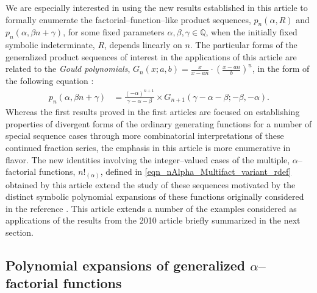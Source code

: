 \documentclass[12pt,reqno]{article}
\numberwithin{sfootnote}{section}
\numberwithin{equation}{section}
\theoremstyle{DefaultTheoremStyle}
\theoremstyle{definition}
\newcommand{\FFactII}[2]{\ensuremath{#1^{\underline{#2}}}}
\newcommand{\MultiFactorial}[2]{\ensuremath{#1!_{\left(#2\right)}}}
\newcommand{\pn}[3]{\ensuremath{p_{#1}\left(#2, #3\right)}}
\begin{document}
We are especially interested in using the new results established in this 
article to formally enumerate the 
factorial--function--like product sequences, 
$\pn{n}{\alpha}{R}$ and $\pn{n}{\alpha}{\beta n + \gamma}$, for some fixed 
parameters $\alpha, \beta, \gamma \in \mathbb{Q}$, when the 
initially fixed symbolic indeterminate, $R$, depends linearly on $n$. 
The particular forms of the 
generalized product sequences of interest in the 
applications of this article are related to the \emph{Gould polynomials}, 
$G_n(x; a, b) = \frac{x}{x-an} \cdot \FFactII{\left(\frac{x-an}{b}\right)}{n}$, 
in the form of the following equation 
\citep[\S 3.4.2]{MULTIFACTJIS} \citep[\S 4.1.4]{UC}: 
\begin{align} 
\label{eqn_pnAlphaBetanpGamma_GouldPolyExp_Ident-stmt_v1} 
\pn{n}{\alpha}{\beta n + \gamma} & = 
     \frac{(-\alpha)^{n+1}}{\gamma-\alpha-\beta} \times 
     G_{n+1}\left(\gamma-\alpha-\beta; -\beta, -\alpha\right). 
\end{align} 
Whereas the first results proved in the first articles 
\citep{FLAJOLET80B,FLAJOLET82} 
are focused on establishing properties of divergent forms of the 
ordinary generating functions for a number of special sequence cases 
through more combinatorial interpretations of these 
continued fraction series, the emphasis in this article 
is more enumerative in flavor. 
The new identities involving the integer--valued cases of the 
multiple, $\alpha$--factorial functions, $\MultiFactorial{n}{\alpha}$, 
defined in \eqref{eqn_nAlpha_Multifact_variant_rdef} 
obtained by this article 
extend the study of these sequences motivated by the 
distinct symbolic polynomial expansions of these functions 
originally considered in the reference \citep{MULTIFACTJIS}. 
This article extends a number of the examples considered as 
applications of the results from the 2010 article %
briefly summarized in the next section. 

\subsection{Polynomial expansions of generalized $\alpha$--factorial functions} 
\label{subSection_GenAlphaFactorialTriangle_exps} 
\end{document}
